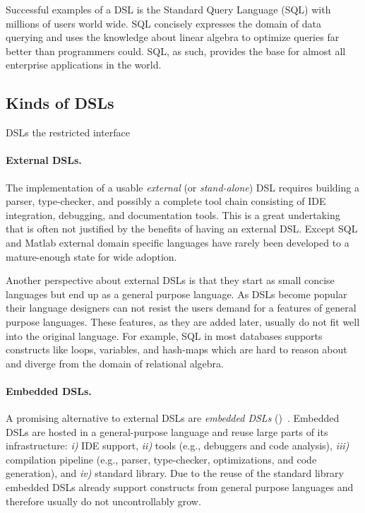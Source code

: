 Successful examples of a DSL is the Standard Query Language (SQL) with millions of users world wide.
 SQL concisely expresses the domain of data querying and uses the knowledge about linear algebra
 to optimize queries far better than programmers could. SQL, as such, provides the base for almost all
 enterprise applications in the world.

\subsection{Kinds of DSLs}
\label{sec:kinds-of-dsls}

DSLs the restricted interface

\paragraph{External DSLs.} The implementation of a usable \emph{external}
(or \emph{stand-alone}) DSL requires building a parser, type-checker, and possibly a complete
tool chain consisting of IDE integration, debugging, and documentation
tools. This is a great undertaking that is often not justified by the
benefits of having an external DSL. Except SQL and Matlab external domain specific
languages have rarely been developed to a mature-enough state for wide adoption.

Another perspective about external DSLs is that they start as small concise languages but
 end up as a general purpose language. As DSLs become popular their  language designers
 can not resist the users demand for a features of general purpose languages. These features,
 as they are added later, usually do not fit well into the original language.
 For example, SQL in most databases supports constructs like loops, variables,
 and hash-maps which are hard to reason about and diverge from the domain of
 relational algebra.

\paragraph{Embedded DSLs.} A promising alternative to external DSLs are \emph{embedded DSLs} (\edsls)~\cite{Hudak96csur}. Embedded DSLs
are hosted in a general-purpose language and reuse large parts of its
infrastructure: \emph{i)} IDE support, \emph{ii)} tools (e.g., debuggers and code analysis), \emph{iii)} compilation pipeline (e.g.,
 parser, type-checker, optimizations, and code generation), and \emph{iv)} standard library. Due to
 the reuse of the standard library embedded DSLs already support constructs from general purpose languages and
 therefore usually do not uncontrollably grow.

